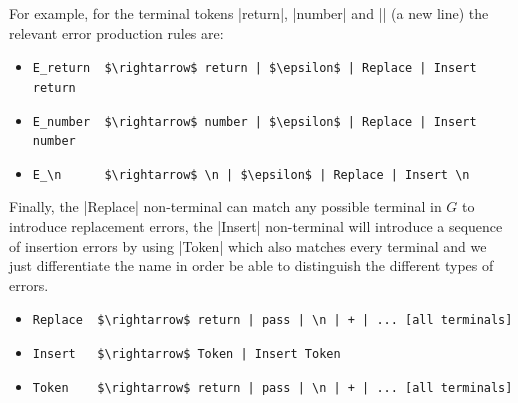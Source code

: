 
For example, for the terminal tokens |return|, |number| and |\n| (a new line)
the relevant error production rules are:
\begin{itemize}
  \item \lstinline{E_return  $\rightarrow$ return | $\epsilon$ | Replace | Insert return}
  \item \lstinline{E_number  $\rightarrow$ number | $\epsilon$ | Replace | Insert number}
  \item \lstinline{E_\n      $\rightarrow$ \n | $\epsilon$ | Replace | Insert \n}
\end{itemize}
Finally, the |Replace| non-terminal can match any possible terminal in $G$ to
introduce replacement errors, the |Insert| non-terminal will introduce a
sequence of insertion errors by using |Token| which also matches every terminal
and we just differentiate the name in order be able to distinguish the different
types of errors.
\begin{itemize}
  \item \lstinline{Replace  $\rightarrow$ return | pass | \n | + | ... [all terminals]}
  \item \lstinline{Insert   $\rightarrow$ Token | Insert Token}
  \item \lstinline{Token    $\rightarrow$ return | pass | \n | + | ... [all terminals]}
\end{itemize}







